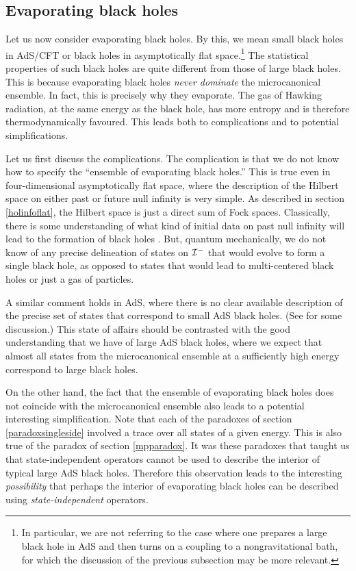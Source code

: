 \documentclass[12pt]{article}
\def \scrim{{\cal I}^{-}}
\begin{document}
\subsection{Evaporating black holes \label{structureevap}}
Let us now consider evaporating black holes. By this, we mean small black holes in AdS/CFT or black holes in asymptotically flat space.\footnote{In particular, we are not referring to the case where one prepares a large black hole in AdS and then turns on a coupling to a nongravitational bath, for which the discussion of the previous subsection may be more relevant.} The statistical properties of such black holes are quite different from those of large black holes. This is because evaporating black holes {\em never dominate} the microcanonical ensemble. In fact, this is precisely why they evaporate. The gas of Hawking radiation, at the same energy as the black hole, has more entropy and is therefore thermodynamically favoured. This leads both to complications and to potential simplifications.

Let us first discuss the complications. The complication is that we do not know how to specify the ``ensemble of evaporating black holes.'' This is true even in four-dimensional asymptotically flat space, where the description of the Hilbert space on either past or future null infinity is very simple. As described in section \ref{holinfoflat}, the Hilbert space is just a direct sum of Fock spaces. Classically, there is some understanding of what kind of initial data on past null infinity will lead to the formation of black holes \cite{Gundlach:2007gc}. But, quantum mechanically, we do not know of any precise delineation of states on $\scrim$ that would evolve to form a single black hole, as opposed to states that would lead to multi-centered black holes or just a gas of particles.

A similar comment holds in AdS, where there is no clear available description of the precise set of states that correspond to small AdS black holes. (See  \cite{Hanada:2016pwv} for some discussion.) This state of affairs should be contrasted with the good understanding that we have of large AdS black holes, where we expect that almost all states from the microcanonical ensemble at a sufficiently high energy correspond to large black holes.



On the other hand, the fact that the ensemble of evaporating black holes does not coincide with the microcanonical ensemble also leads to a potential interesting simplification. Note that each of the paradoxes of section \ref{paradoxsingleside} involved a trace over all states of a given energy. This is also true of the paradox of section \ref{mpparadox}. It was these paradoxes that taught us that state-independent operators cannot be used to describe the interior of typical large AdS black holes. Therefore this observation leads to the interesting {\em possibility} that perhaps the interior of evaporating black holes can be described using {\em state-independent} operators.
\end{document}
